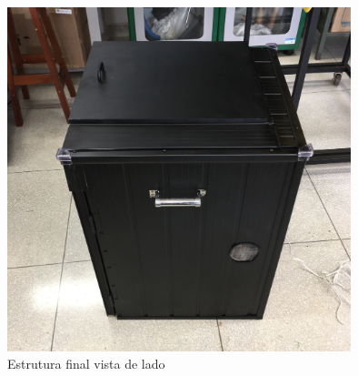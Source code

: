 \begin{figure}[H]
	\centering
	\includegraphics[width=10cm]{figuras/estufapreta_lado.JPG}
	\caption{Estrutura final vista de lado}
	\label{fig:estufapreta_lado }
\end{figure}
